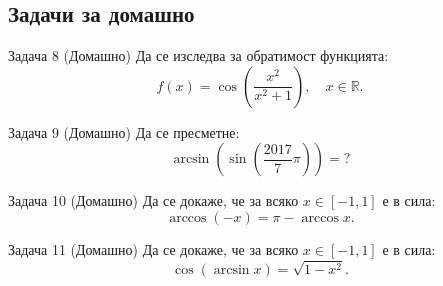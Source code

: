\vspace{2em}

\subsection*{Задачи за домашно}

\begin{problembox}{Задача 8 (Домашно)}
Да се изследва за обратимост функцията:
\[
f(x) = \cos\left(\frac{x^2}{x^2 + 1}\right), \quad x \in \mathbb{R}.
\]
\end{problembox}

\begin{problembox}{Задача 9 (Домашно)}
Да се пресметне:
\[
\arcsin\left(\sin\left(\frac{2017}{7}\pi\right)\right) = ?
\]
\end{problembox}

\begin{problembox}{Задача 10 (Домашно)}
Да се докаже, че за всяко $x \in [-1, 1]$ е в сила:
\[
\arccos(-x) = \pi - \arccos x.
\]
\end{problembox}

\begin{problembox}{Задача 11 (Домашно)}
Да се докаже, че за всяко $x \in [-1, 1]$ е в сила:
\[
\cos(\arcsin x) = \sqrt{1 - x^2}.
\]
\end{problembox}
